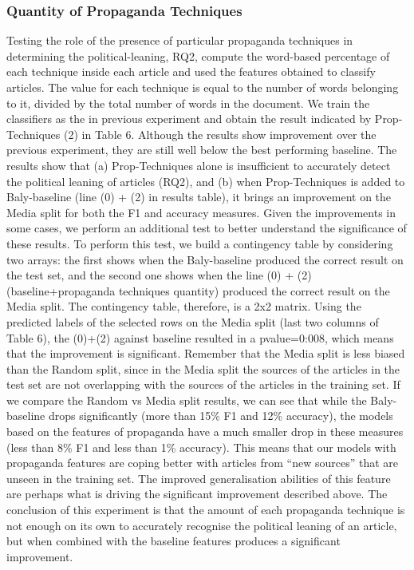 \subsubsection{Quantity of Propaganda Techniques}
Testing the role of the presence of particular propaganda techniques in determining the political-leaning, RQ2, compute the word-based percentage of each technique inside each article and used the features obtained to classify articles. The value for each technique is equal to the number of words belonging to it, divided by the total number of words in the document.
We train the classifiers as the in previous experiment and obtain the result indicated by Prop-Techniques (2) in Table 6. Although the results show improvement over the previous experiment, they are still well below the best performing baseline. The results show that (a) Prop-Techniques alone is insufficient to accurately detect the political leaning of articles (RQ2), and (b) when Prop-Techniques is added to Baly-baseline (line (0) + (2) in results table), it brings an improvement on the Media split for both the F1 and accuracy measures. 
Given the improvements in some cases, we perform an additional test to better understand the significance of these results. To perform this test, we build a contingency table by considering two arrays: the first shows when the Baly-baseline produced the correct result on the test set, and the second one shows when the line (0) + (2) (baseline+propaganda techniques quantity) produced the correct result on the Media split. The contingency table, therefore, is a 2x2 matrix.
Using the predicted labels of the selected rows on the Media split (last two columns of Table 6), the (0)+(2) against baseline resulted in a pvalue=0:008, which means that the improvement is significant. Remember that the Media split is less biased than the Random split, since in the Media split the sources of the articles in the test set are not overlapping with the sources of the articles in the training set. If we compare the Random vs Media split results, we can see that while the Baly-baseline drops significantly (more than 15\% F1 and 12\% accuracy), the models based on the features of propaganda have a much smaller drop in these measures (less than 8\% F1 and less than 1\% accuracy). This means that our models with propaganda features are coping better with articles from “new sources” that are unseen in the training set. The improved generalisation abilities of this feature are perhaps what is driving the significant improvement described above.
The conclusion of this experiment is that the amount of each propaganda technique is not enough on its own to accurately recognise the political leaning of an article, but when combined with the baseline features produces a significant improvement.


